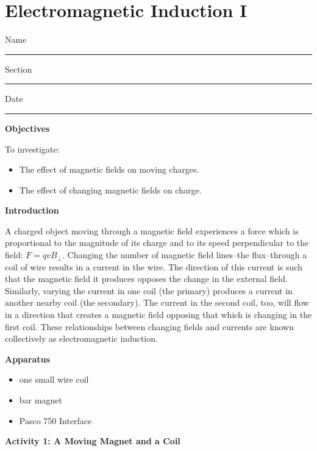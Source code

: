 
\section{Electromagnetic Induction I}

Name \rule{2.0in}{0.1pt}\hfill{}Section \rule{1.0in}{0.1pt}\hfill{}Date
\rule{1.0in}{0.1pt}

\textbf{Objectives}

To investigate:

\begin{itemize}
\item The effect of magnetic fields on moving charges. 
\item The effect of changing magnetic fields on charge.
\end{itemize}
\textbf{Introduction} 

A charged object moving through a magnetic field experiences a force
which is proportional to the magnitude of its charge and to its speed
perpendicular to the field: $F = qvB_\perp$. Changing the number of
magnetic field lines--the flux--through a coil of wire results in
a current in the wire. The direction of this current is such that
the magnetic field it produces opposes the change in the external
field. Similarly, varying the current in one coil (the primary) produces
a current in another nearby coil (the secondary). The current in the
second coil, too, will flow in a direction that creates a magnetic
field opposing that which is changing in the first coil. These relationships
between changing fields and currents are known collectively as electromagnetic
induction.

\textbf{Apparatus} 

\begin{itemize}
\item one small wire coil
\item bar magnet
\item Pasco 750 Interface
\end{itemize}
\textbf{Activity 1: A Moving Magnet and a Coil}

